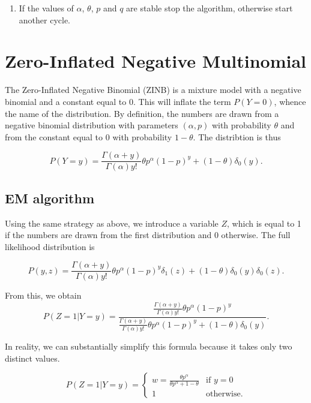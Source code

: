 \documentclass[12pt]{article}
\begin{document}
\begin{appendices}
\begin{enumerate}
      \item If the values of $\alpha$, $\theta$, $p$ and $q$ are
      stable stop the algorithm, otherwise start another cycle.
    \end{enumerate}

    \section{Zero-Inflated Negative Multinomial}

    The Zero-Inflated Negative Binomial (ZINB) is a mixture model
    with a negative binomial and a constant equal to 0. This will
    inflate the term $P(Y=0)$, whence the name of the distribution.
    By definition, the numbers are drawn from a negative binomial
    distribution with parameters $(\alpha, p)$ with probability
    $\theta$ and from the constant equal to 0 with probability
    $1-\theta$. The distribtion is thus

    \begin{equation*}
\label{ZINB}
    P(Y = y) = \frac{\Gamma(\alpha+y)}{\Gamma(\alpha)y!}
    \theta p^{\alpha}(1-p)^y + (1-\theta)\delta_0(y).
    \end{equation*}

    \subsection{EM algorithm}
    Using the same strategy as above, we introduce a variable $Z$,
    which is equal to 1 if the numbers are drawn from the first
    distribution and 0 otherwise. The full likelihood distribution
    is

    \begin{equation*}
    P(y,z) = \frac{\Gamma(\alpha+y)}{\Gamma(\alpha)y!}
    \theta p^{\alpha}(1-p)^y\delta_1(z) +
    (1-\theta)\delta_0(y)\delta_0(z).
    \end{equation*}

    From this, we obtain
    \begin{equation*}
    P(Z=1|Y=y) =\frac{\frac{\Gamma(\alpha+y)}{\Gamma(\alpha)y!}
    \theta p^{\alpha}(1-p)^y}{
    \frac{\Gamma(\alpha+y)}{\Gamma(\alpha)y!}
    \theta p^{\alpha}(1-p)^y + (1-\theta)\delta_0(y)}.
    \end{equation*}

    In reality, we can substantially simplify this formula because
    it takes only two distinct values.

    \begin{equation*}
    P(Z=1|Y=y) = \left\{
      \begin{array}{ll}
        w = \frac{\theta p^{\alpha}}{\theta p^{\alpha}+1-\theta}
        & \mbox{if } y = 0\\
        1 & \mbox{otherwise.}
      \end{array}
    \right.
    \end{equation*}


\end{appendices}
\end{document}
